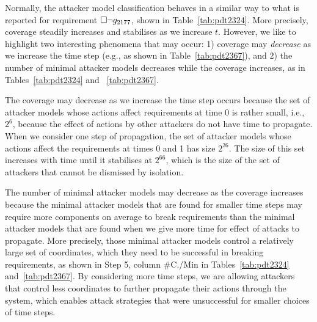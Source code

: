 Normally, the attacker model classification behaves in a similar way to what is reported for requirement $ {{\square}} \lnot g_{2177}$, shown in Table~\ref{tab:pdt2324}. More precisely, coverage steadily increases and stabilises as we increase $t$. However, we like to highlight two interesting phenomena that may occur: 1) coverage {may} \emph{decrease} as we increase the time step (e.g., as shown in Table~\ref{tab:pdt2367}), and 2) the number of minimal attacker models decreases while the coverage increases, as in Tables~\ref{tab:pdt2324} and ~\ref{tab:pdt2367}. 

The coverage may decrease as we increase the time step occurs because the set of attacker models whose actions affect requirements at time 0 is rather small, i.e., $2^6$, because the effect of actions by other attackers do not have time to propagate. When we consider one step of propagation, the set of attacker models whose actions affect the requirements at times 0 and 1 has size $2^{26}$. The size of this set increases with time until it stabilises at $2^{66}$, which is the size of the set of attackers that cannot be dismissed by isolation. 

The number of minimal attacker models may decrease as the coverage increases because the minimal attacker models that are found for smaller time steps may require more components on average to break requirements than the minimal attacker models that are found when we give more time for effect of attacks to propagate. 
More precisely, those minimal attacker models control a relatively large set of coordinates, which they need to be successful in breaking requirements, as shown in Step 5, column \#C./Min in Tables~\ref{tab:pdt2324} and~\ref{tab:pdt2367}. By considering more time steps, we are allowing attackers that control less coordinates to further propagate their actions through the system, which enables attack strategies that were unsuccessful for smaller choices of time steps.

